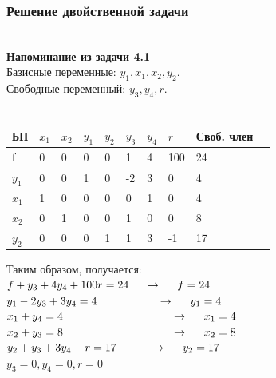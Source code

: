\documentclass[14pt,a4paper,fleqn]{extarticle}
\begin{document}
\subsubsection*{Решение двойственной задачи}
\noindent\makebox[\linewidth]{\rule{\paperwidth}{0.4pt}}\\
\textbf{Напоминание из задачи 4.1}\\
Базисные переменные: $y_1, x_1, x_2, y_2$.\\
Свободные переменный: $y_3, y_4, r$.\\\\
\begin{tabularx}{\textwidth}{|p{1cm}|p{1cm}|p{1cm}|p{1cm}|p{1cm}|p{1cm}|p{1cm}|p{1cm}|p{1.2cm}|c}
	\hline
	БП & $x_1$ & $x_2$ & $y_1$ & $y_2$ & $y_3$ & $y_4$ & $r$ & Своб. член & \\
	\hline
	f & 0 & 0 & 0 & 0 & 1 & 4 & 100 & 24 & \\
	\hline
	$y_1$ & 0 & 0 & 1 & 0 & -2 & 3 & 0 & 4 & \\
	\hline
	$x_1$ & 1 & 0 & 0 & 0 & 0 & 1 & 0 & 4\\
	\hline
	$x_2$ & 0 & 1 & 0 & 0 & 1 & 0 & 0 & 8 \\
	\hline
	$y_2$ & 0 & 0 & 0 & 1 & 1 & 3 & -1 & 17\\
	\hline
\end{tabularx}
\newline\newline
Таким образом, получается:\\
$f + y_3 + 4y_4 + 100r = 24 \hspace*{0.5cm} \rightarrow \hspace*{0.5cm} f = 24$\\
$y_1 - 2y_3 + 3y_4 = 4 \hspace*{1.9cm} \rightarrow \hspace*{0.5cm} y_1 = 4$\\
$x_1 + y_4 = 4 \hspace*{3.4cm} \rightarrow \hspace*{0.5cm} x_1 = 4$\\
$x_2 + y_3 = 8 \hspace*{3.4cm} \rightarrow \hspace*{0.5cm} x_2 = 8$\\
$y_2 + y_3 + 3y_4 - r = 17 \hspace*{1.05cm} \rightarrow \hspace*{0.5cm} y_2 = 17$\\
$y_3 = 0, y_4 = 0, r = 0$\\
\noindent\makebox[\linewidth]{\rule{\paperwidth}{0.4pt}}\\
\end{document}
